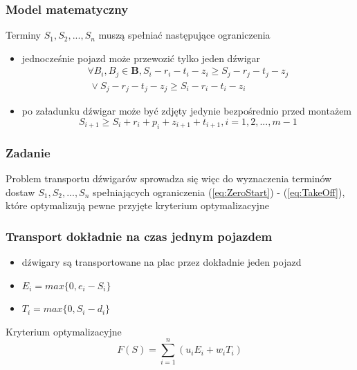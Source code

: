 \documentclass{beamer}
\begin{document}
 \begin{frame}
 \frametitle{Model matematyczny}
 
 \begin{block}{Terminy $S_1, S_2,...,S_n $ muszą spełniać następujące ograniczenia}
 \begin{itemize}
       \item jednocześnie pojazd może przewozić tylko jeden dźwigar
     \begin{equation}\label{eq:OneVehicle}
     \begin{split}
      \forall B_i, B_j \in \textbf{B}, S_i - r_i - t_i - z_i \ge S_j - r_j - t_j - z_j
      \\ \   \vee S_j - r_j - t_j - z_j \ge S_i - r_i - t_i - z_i
     \end{split}
     \end{equation}
     \item po załadunku dźwigar może być zdjęty jedynie bezpośrednio przed montażem
      \begin{equation}\label{eq:TakeOff}
      S_{i+1} \ge S_i + r_i + p_i + z_{i+1} + t_{i+1}, i = 1,2,...,m-1
      \end{equation}        
 \end{itemize}
 \end{block}
\end{frame}

\begin{frame}
 \frametitle{Zadanie}
 \begin{block}{}
 Problem transportu dźwigarów sprowadza się więc do wyznaczenia terminów dostaw $S_1, S_2,...,S_n $ spełniających ograniczenia (\ref{eq:ZeroStart})
 - (\ref{eq:TakeOff}), które optymalizują pewne przyjęte kryterium optymalizacyjne
  
 \end{block}
\end{frame}


\begin{frame}
 \frametitle{Transport dokładnie na czas jednym pojazdem}
 \begin{itemize}
  \item dźwigary są transportowane na plac przez dokładnie jeden pojazd
 \end{itemize}
 \begin{block}{}
 \begin{itemize}
 \item $ E_i = max \lbrace 0, e_i - S_i \rbrace $ 
 \item $ T_i = max \lbrace 0, S_i - d_i \rbrace $
 \end{itemize}
 \end{block}
 
 \begin{block}{Kryterium optymalizacyjne}
  \begin{equation}
   F(S) = \sum\limits_{i=1}^{n}(u_iE_i + w_iT_i) 
  \end{equation}
 \end{block}

\end{frame}
\end{document}
